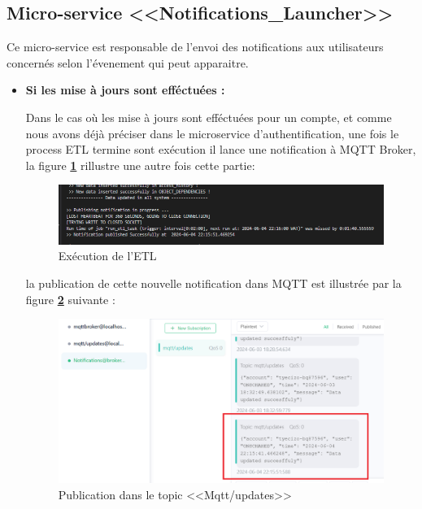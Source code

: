 \subsection{Micro-service <<Notifications\_Launcher>>}
\par Ce micro-service est responsable de l'envoi des notifications aux utilisateurs concernés selon l'évenement qui peut apparaitre.
\begin{itemize}
    \item \textbf{Si les mise à jours sont efféctuées :}
        \par Dans le cas où les mise à jours sont efféctuées pour un compte, et comme nous avons déjà préciser dans le  microservice d'authentification, une fois le process ETL termine sont exécution il lance une notification à MQTT Broker, la figure \textbf{\ref{fig:step1}} rillustre une autre fois cette partie: 
        \begin{figure}[H]
            \centering
            \includegraphics[width =1\linewidth]{img/captures/notifications/updatelaunch.png}
            \caption{Exécution de l'ETL}
            \label{fig:step1}
        \end{figure}
        \par la publication de cette nouvelle notification dans MQTT est illustrée par la figure \textbf{\ref{fig:step2}} suivante :
        \begin{figure}[H]
            \centering
            \includegraphics[width =1\linewidth]{img/captures/notifications/mqtt.png}
            \caption{Publication dans le topic <<Mqtt/updates>>}
            \label{fig:step2}
        \end{figure}

\end{itemize}
